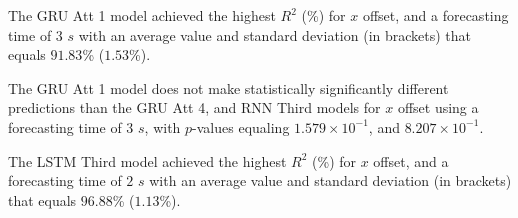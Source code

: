 \begin{table}[!ht]
	\centering
	\caption{The average $R^{2}$ (\%), with standard deviation in brackets, across $k$-fold validation datasets for the $x$ offset estimated on the $k$-fold testing datasets by different RNN models, and forecasting times.}
	\label{tab:best_longitude_no_abs_R2}
\end{table}

The GRU Att 1 model achieved the highest $R^{2}$ (\%) for $x$ offset, and a forecasting time of $3$ $s$ with an average value and standard deviation (in brackets) that equals $91.83$\% ($1.53$\%).

The GRU Att 1 model does not make statistically significantly different predictions than the GRU Att 4, and RNN Third models for $x$ offset using a forecasting time of $3$ $s$, with $p$-values equaling $1.579 \times 10^{-1}$, and $8.207 \times 10^{-1}$.


The LSTM Third model achieved the highest $R^{2}$ (\%) for $x$ offset, and a forecasting time of $2$ $s$ with an average value and standard deviation (in brackets) that equals $96.88$\% ($1.13$\%).

